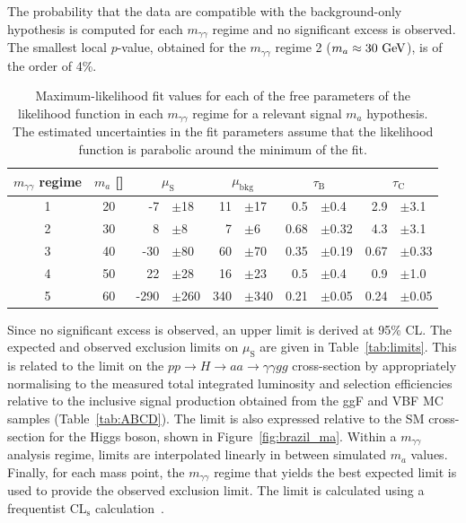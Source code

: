 The probability that the data are compatible with the background-only hypothesis is computed for each $m_{\gamma\gamma}$ regime and no significant 
excess is observed. The smallest local $p$-value, obtained for the $m_{\gamma\gamma}$ regime 2 ($m_a\approx30~\mathrm{GeV}{}$), is of the order of 4\%.
\begin{table}[t]
  \begin{center}
    \caption{Maximum-likelihood fit values for each of the free parameters of the likelihood function 
      in each $m_{\gamma\gamma}$ regime for a relevant signal $m_a$ hypothesis.
      The estimated uncertainties in the fit parameters assume
      that the likelihood function is parabolic around the minimum of the fit.
    }
    \label{tab:MLE}
          {\footnotesize
	    \begin{tabular}{
                cc
                r@{}lr@{}l
                r@{}lr@{}l
              }
	      \hline
              $m_{\gamma\gamma}$ regime & $m_a$ [\GeV{}] &   \multicolumn{2}{c}{$\mu_\text{S}$} &   \multicolumn{2}{c}{$\mu_\text{bkg}$}  &   \multicolumn{2}{c}{$\tau_\text{B}$} & \multicolumn{2}{c}{$\tau_\text{C}$} \\
	      \hline
              1 & 20 &  -7&$\pm$18    & 11&$\pm$17   & 0.5 &$\pm$0.4 &  2.9&$\pm$3.1   \\
              2 & 30 &  8&$\pm$8      & 7&$\pm$6     & 0.68 &$\pm$0.32 & 4.3&$\pm$3.1   \\
              3 & 40 &  -30&$\pm$80   & 60&$\pm$70   & 0.35 &$\pm$0.19 & 0.67&$\pm$0.33 \\
              4 & 50 &  22&$\pm$28    & 16&$\pm$23   & 0.5 &$\pm$0.4 & 0.9&$\pm$1.0   \\
              5 & 60 &  -290&$\pm$260 & 340&$\pm$340 & 0.21&$\pm$0.05 & 0.24&$\pm$0.05 \\
	      \hline
	    \end{tabular}
          }
  \end{center}
\end{table}
Since no significant excess is observed, an upper limit is derived at 95\% CL.            
The expected and observed exclusion limits on $\mu_\text{S}$ are given in Table~\ref{tab:limits}.
This is related to the limit on the $pp\to H\to aa \to \gamma\gamma gg$ cross-section by appropriately normalising to the measured total integrated luminosity 
and selection efficiencies relative to the inclusive signal production obtained from the ggF and VBF MC samples (Table~\ref{tab:ABCD}).
The limit is also expressed relative to the SM cross-section for the Higgs boson, shown in Figure~\ref{fig:brazil_ma}.
Within a $m_{\gamma\gamma}$ analysis regime, limits are interpolated linearly in between simulated $m_a$ values.
Finally, for each mass point, the $m_{\gamma\gamma}$ regime that yields the best expected limit is used to provide the observed exclusion limit.
The limit is calculated using a frequentist $\text{CL}_\text{s}$ calculation~\cite{Read:2002hq}. 


